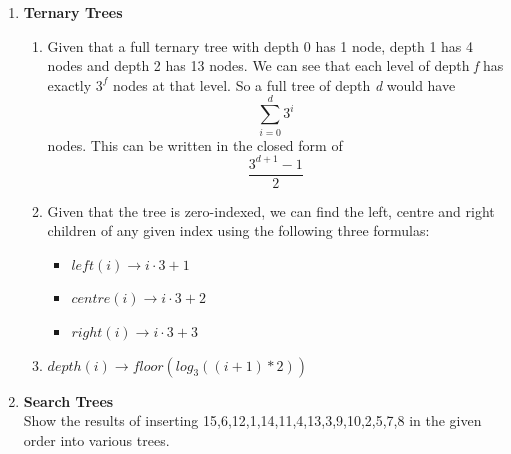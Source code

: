 \documentclass{article}
\begin{document}
\begin{enumerate}
  \item \textbf{Ternary Trees}
  	\begin{enumerate}
  		\item Given that a full ternary tree with depth 0 has 1 node, depth 1 has 4 nodes and depth 2 has 13 nodes. We can see that each level of depth \textit{f} has exactly $3^\textit{f}$ nodes at that level. So a full tree of depth \textit{d} would have $$\sum_{i=0}^{d} 3^i $$ nodes. This can be written in the closed form of $$\frac{3^{d+1} - 1}{2}$$
  		\item Given that the tree is zero-indexed, we can find the left, centre and right children of any given index using the following three formulas:
  		\begin{itemize}
  			\item $left(i)  \rightarrow i \cdot 3 + 1$
  			\item $centre(i) \rightarrow i \cdot 3 + 2$
  			\item $right(i) \rightarrow i \cdot 3 + 3$
  		\end{itemize}
  		\item $depth(i) \rightarrow floor(log_3 ((i + 1)*2))$ 
  		\\
  		
  	\end{enumerate}
 
 \item \textbf{Search Trees}
 	\\	
 	Show the results of inserting 15,6,12,1,14,11,4,13,3,9,10,2,5,7,8 in the given order into various trees.
 	

\end{enumerate}
\end{document}
